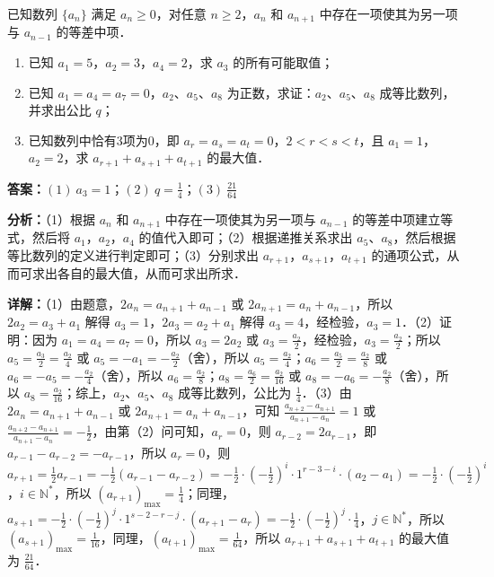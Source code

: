 \begin{question}[points=18]
已知数列 $\{a_n\}$ 满足 $a_n\ge 0$，对任意 $n\ge 2$，$a_n$ 和 $a_{n+1}$ 中存在一项使其为另一项与 $a_{n-1}$ 的等差中项．\begin{enumerate}\item[(1)] 已知 $a_1=5$，$a_2=3$，$a_4=2$，求 $a_3$ 的所有可能取值；\item[(2)] 已知 $a_1=a_4=a_7=0$，$a_2$、$a_5$、$a_8$ 为正数，求证：$a_2$、$a_5$、$a_8$ 成等比数列，并求出公比 $q$；\item[(3)] 已知数列中恰有3项为0，即 $a_r=a_s=a_t=0$，$2<r<s<t$，且 $a_1=1$，$a_2=2$，求 $a_{r+1}+a_{s+1}+a_{t+1}$ 的最大值．\end{enumerate}
\begin{solution}
\textbf{答案：}$(1)\ a_3=1$；$(2)\ q=\frac{1}{4}$；$(3)\ \frac{21}{64}$

\textbf{分析：}（1）根据 $a_n$ 和 $a_{n+1}$ 中存在一项使其为另一项与 $a_{n-1}$ 的等差中项建立等式，然后将 $a_1$，$a_2$，$a_4$ 的值代入即可；\newline（2）根据递推关系求出 $a_5$、$a_8$，然后根据等比数列的定义进行判定即可；\newline（3）分别求出 $a_{r+1}$，$a_{s+1}$，$a_{t+1}$ 的通项公式，从而可求出各自的最大值，从而可求出所求．

\textbf{详解：}（1）由题意，$2a_n=a_{n+1}+a_{n-1}$ 或 $2a_{n+1}=a_n+a_{n-1}$，所以 $2a_2=a_3+a_1$ 解得 $a_3=1$，$2a_3=a_2+a_1$ 解得 $a_3=4$，经检验，$a_3=1$．\newline（2）证明：因为 $a_1=a_4=a_7=0$，所以 $a_3=2a_2$ 或 $a_3=\frac{a_2}{2}$，经检验，$a_3=\frac{a_2}{2}$；所以 $a_5=\frac{a_3}{2}=\frac{a_2}{4}$ 或 $a_5=-a_1=-\frac{a_2}{2}$（舍），所以 $a_5=\frac{a_2}{4}$；$a_6=\frac{a_5}{2}=\frac{a_2}{8}$ 或 $a_6=-a_5=-\frac{a_2}{4}$（舍），所以 $a_6=\frac{a_2}{8}$；$a_8=\frac{a_6}{2}=\frac{a_2}{16}$ 或 $a_8=-a_6=-\frac{a_2}{8}$（舍），所以 $a_8=\frac{a_2}{16}$；综上，$a_2$、$a_5$、$a_8$ 成等比数列，公比为 $\frac{1}{4}$．\newline（3）由 $2a_n=a_{n+1}+a_{n-1}$ 或 $2a_{n+1}=a_n+a_{n-1}$，可知 $\frac{a_{n+2}-a_{n+1}}{a_{n+1}-a_n}=1$ 或 $\frac{a_{n+2}-a_{n+1}}{a_{n+1}-a_n}=-\frac{1}{2}$，由第（2）问可知，$a_r=0$，则 $a_{r-2}=2a_{r-1}$，即 $a_{r-1}-a_{r-2}=-a_{r-1}$，所以 $a_r=0$，则 $a_{r+1}=\frac{1}{2}a_{r-1}=-\frac{1}{2}(a_{r-1}-a_{r-2})=-\frac{1}{2}\cdot(-\frac{1}{2})^i\cdot 1^{r-3-i}\cdot(a_2-a_1)=-\frac{1}{2}\cdot(-\frac{1}{2})^i$，$i\in\mathbb{N}^*$，所以 $(a_{r+1})_{\max}=\frac{1}{4}$；同理，$a_{s+1}=-\frac{1}{2}\cdot(-\frac{1}{2})^j\cdot 1^{s-2-r-j}\cdot(a_{r+1}-a_r)=-\frac{1}{2}\cdot(-\frac{1}{2})^j\cdot\frac{1}{4}$，$j\in\mathbb{N}^*$，所以 $(a_{s+1})_{\max}=\frac{1}{16}$，同理，$(a_{t+1})_{\max}=\frac{1}{64}$，所以 $a_{r+1}+a_{s+1}+a_{t+1}$ 的最大值为 $\frac{21}{64}$．
\end{solution}
\end{question}

